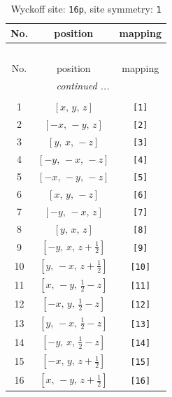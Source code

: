 \documentclass[fleqn,8pt]{jsarticle}
\begin{document}
\begin{longtable}{ccc}
\caption{Wyckoff site: {\tt 16p}, site symmetry: {\tt 1}}
 \\
 \hline \hline
No. & position & mapping \\ \hline \endfirsthead

\multicolumn{2}{l}{\tablename\ \thetable{}} \\
 \hline \hline
No. & position & mapping \\ \hline \endhead

 \hline \hline
\multicolumn{2}{r}{\footnotesize\it continued ...} \\ \endfoot

 \hline \hline
\multicolumn{2}{r}{} \\ \endlastfoot

1 & $\left[ x,\, y,\, z \right]$ & {\tt [1]} \\ \hline
2 & $\left[ - x,\, - y,\, z \right]$ & {\tt [2]} \\ \hline
3 & $\left[ y,\, x,\, - z \right]$ & {\tt [3]} \\ \hline
4 & $\left[ - y,\, - x,\, - z \right]$ & {\tt [4]} \\ \hline
5 & $\left[ - x,\, - y,\, - z \right]$ & {\tt [5]} \\ \hline
6 & $\left[ x,\, y,\, - z \right]$ & {\tt [6]} \\ \hline
7 & $\left[ - y,\, - x,\, z \right]$ & {\tt [7]} \\ \hline
8 & $\left[ y,\, x,\, z \right]$ & {\tt [8]} \\ \hline
9 & $\left[ - y,\, x,\, z + \frac{1}{2} \right]$ & {\tt [9]} \\ \hline
10 & $\left[ y,\, - x,\, z + \frac{1}{2} \right]$ & {\tt [10]} \\ \hline
11 & $\left[ x,\, - y,\, \frac{1}{2} - z \right]$ & {\tt [11]} \\ \hline
12 & $\left[ - x,\, y,\, \frac{1}{2} - z \right]$ & {\tt [12]} \\ \hline
13 & $\left[ y,\, - x,\, \frac{1}{2} - z \right]$ & {\tt [13]} \\ \hline
14 & $\left[ - y,\, x,\, \frac{1}{2} - z \right]$ & {\tt [14]} \\ \hline
15 & $\left[ - x,\, y,\, z + \frac{1}{2} \right]$ & {\tt [15]} \\ \hline
16 & $\left[ x,\, - y,\, z + \frac{1}{2} \right]$ & {\tt [16]} \\
\end{longtable}
\end{document}
